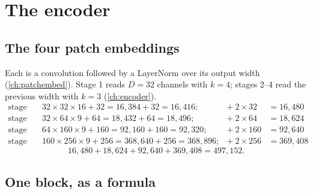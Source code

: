 \section{The encoder}\label{sec:params:encoder}

\subsection{The four patch embeddings}

Each is a convolution followed by a LayerNorm over its output width (\cref{ch:patchembed}). Stage 1
reads $D = 32$ channels with $k = 4$; stages 2--4 read the previous width with $k = 3$
(\cref{ch:encoder}).
\begin{align*}
\text{stage 1:}\quad & 32 \times 32 \times 16 + 32 = 16{,}384 + 32 = 16{,}416; & +\ 2 \times 32 &= 16{,}480\\
\text{stage 2:}\quad & 32 \times 64 \times 9 + 64 = 18{,}432 + 64 = 18{,}496; & +\ 2 \times 64 &= 18{,}624\\
\text{stage 3:}\quad & 64 \times 160 \times 9 + 160 = 92{,}160 + 160 = 92{,}320; & +\ 2 \times 160 &= 92{,}640\\
\text{stage 4:}\quad & 160 \times 256 \times 9 + 256 = 368{,}640 + 256 = 368{,}896; & +\ 2 \times 256 &= 369{,}408
\end{align*}
\[
16{,}480 + 18{,}624 + 92{,}640 + 369{,}408 = 497{,}152 .
\]

\subsection{One block, as a formula}

